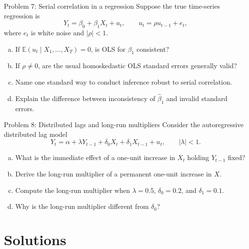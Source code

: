 \documentclass[10pt]{beamer}
\newcommand{\E}{\mathbb{E}}
\begin{document}
\begin{frame}{Problem 7: Serial correlation in a regression}
\label{q7}
\small
Suppose the true time-series regression is
\[
Y_t=\beta_0+\beta_1X_t+u_t,
\qquad
u_t=\rho u_{t-1}+e_t,
\]
where $e_t$ is white noise and $|\rho|<1$.

\begin{enumerate}[(a)]
  \item If $\E(u_t\mid X_1,\ldots,X_T)=0$, is OLS for $\beta_1$ consistent?
  \item If $\rho\neq 0$, are the usual homoskedastic OLS standard errors generally valid?
  \item Name one standard way to conduct inference robust to serial correlation.
  \item Explain the difference between inconsistency of $\hat\beta_1$ and invalid standard errors.
\end{enumerate}

\vfill
\hfill\hyperlink{s7}{}
\end{frame}

\begin{frame}{Problem 8: Distributed lags and long-run multipliers}
\label{q8}
\small
Consider the autoregressive distributed lag model
\[
Y_t=\alpha+\lambda Y_{t-1}+\delta_0X_t+\delta_1X_{t-1}+u_t,
\qquad |\lambda|<1.
\]

\begin{enumerate}[(a)]
  \item What is the immediate effect of a one-unit increase in $X_t$ holding $Y_{t-1}$ fixed?
  \item Derive the long-run multiplier of a permanent one-unit increase in $X$.
  \item Compute the long-run multiplier when $\lambda=0.5$, $\delta_0=0.2$, and $\delta_1=0.1$.
  \item Why is the long-run multiplier different from $\delta_0$?
\end{enumerate}

\vfill
\hfill\hyperlink{s8}{}
\end{frame}

\appendix
\section{Solutions}
\end{document}
